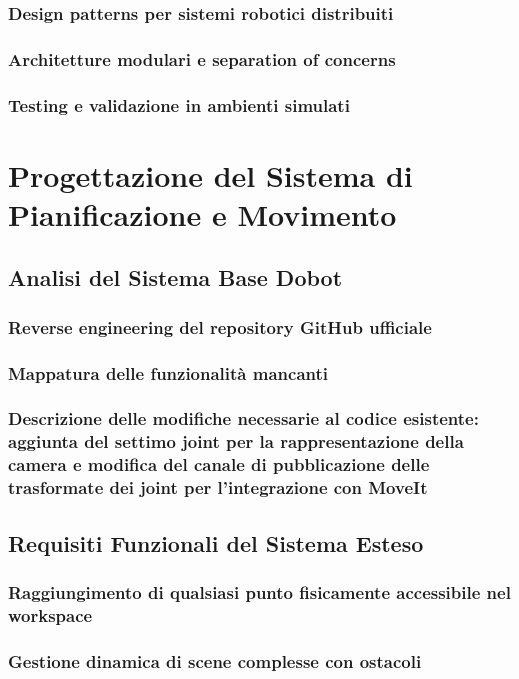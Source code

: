 \documentclass[12pt,a4paper,twoside,openright]{book}
\begin{document}
	\subsection{Design patterns per sistemi robotici distribuiti}
	\subsection{Architetture modulari e separation of concerns}
	\subsection{Testing e validazione in ambienti simulati}
	
	\chapter{Progettazione del Sistema di Pianificazione e Movimento}
	\section{Analisi del Sistema Base Dobot}
	\subsection{Reverse engineering del repository GitHub ufficiale}
	\subsection{Mappatura delle funzionalità mancanti}
	\subsection{Descrizione delle modifiche necessarie al codice esistente: aggiunta del settimo joint per la rappresentazione della camera e modifica del canale di pubblicazione delle trasformate dei joint per l'integrazione con MoveIt}
	
	\section{Requisiti Funzionali del Sistema Esteso}
	\subsection{Raggiungimento di qualsiasi punto fisicamente accessibile nel workspace}
	\subsection{Gestione dinamica di scene complesse con ostacoli}
\end{document}
